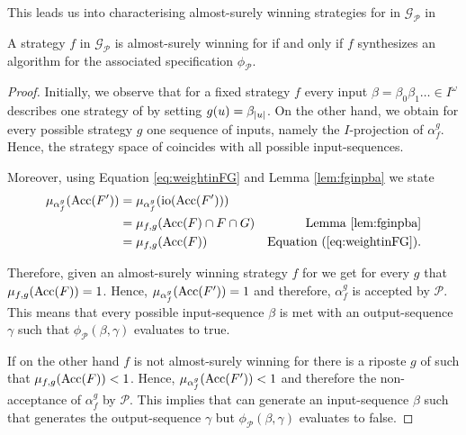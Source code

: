 This leads us into characterising almost-surely winning strategies for \eve{}
in $\mathcal{G}_{\mathcal{P}}$ in
\begin{lemma}
  A strategy $f$ in $\mathcal{G}_{\mathcal{P}}$ is almost-surely winning for
  \eve{} if and only if $f$ synthesizes an algorithm for the associated 
  specification $\phi_{\mathcal{P}}$.
\end{lemma}
\begin{proof}
  Initially, we observe that for a fixed strategy $f$ every input
  $\beta = \beta_{0}\beta_{1}\dots\in I^{\omega}$ describes one strategy of 
  \adam{} by setting $g(u) = \beta_{\left\vert{u}\right\vert}$. On the other hand, we obtain
  for every possible strategy $g$ one sequence of inputs, namely the 
  $I$-projection of $\alpha_{f}^{g}$. Hence, the strategy space of \adam{}
  coincides with all possible input-sequences. 

  Moreover, using Equation \ref{eq:weightinFG} and Lemma \ref{lem:fginpba} we
  state
  \begin{align*}
    \mu_{\alpha_{f}^{g}}(\operatorname{Acc}(F'))
    &= \mu_{\alpha_{f}^{g}}(\operatorname{io}(\operatorname{Acc}(F'))) &\\
    &= \mu_{f,g}(\operatorname{Acc}(F)\cap F\cap G) &\text{Lemma \ref{lem:fginpba}}\\
    &= \mu_{f,g}(\operatorname{Acc}(F)) &\text{Equation (\ref{eq:weightinFG})}.
  \end{align*}

  Therefore, given an almost-surely winning strategy $f$ for \eve{} we get
  for every $g$ that $\mu_{f,g}(\operatorname{Acc}(F)) = 1$. Hence, 
  $\mu_{\alpha_{f}^{g}}(\operatorname{Acc}(F')) = 1$ and therefore, $\alpha_{f}^{g}$ is
  accepted by $\mathcal{P}$. This means that every possible input-sequence
  $\beta$ is met with an output-sequence $\gamma$ such that
  $\phi_{\mathcal{P}}(\beta, \gamma)$ evaluates to true.

  If on the other hand $f$ is not almost-surely winning for \eve{} there is a
  riposte $g$ of \adam{} such that $\mu_{f,g}(\operatorname{Acc}(F)) < 1$. Hence,
  $\mu_{\alpha_{f}^{g}}(\operatorname{Acc}(F')) < 1$ and therefore the non-acceptance of
  $\alpha_{f}^{g}$ by $\mathcal{P}$. This implies that \adam{} can generate an
  input-sequence $\beta$ such that \eve{} generates the output-sequence
  $\gamma$ but $\phi_{\mathcal{P}}(\beta, \gamma)$ evaluates to false.
\end{proof}

